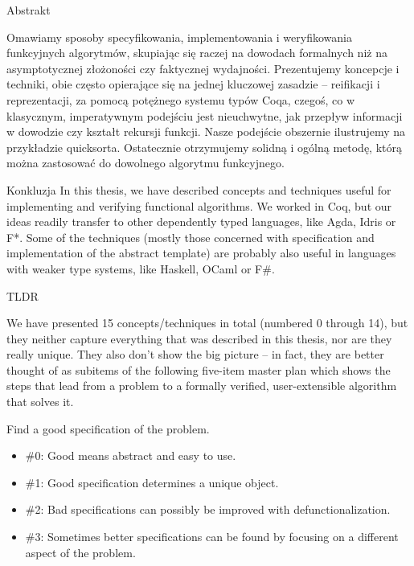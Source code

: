 \documentclass{beamer}
\begin{document}
\begin{frame}{Abstrakt}
\begin{center}
	Omawiamy sposoby specyfikowania, implementowania i weryfikowania funkcyjnych algorytmów, skupiając się raczej na dowodach formalnych niż na asymptotycznej złożoności czy faktycznej wydajności. Prezentujemy koncepcje i techniki, obie często opierające się na jednej kluczowej zasadzie -- reifikacji i reprezentacji, za pomocą potężnego systemu typów Coqa, czegoś, co w klasycznym, imperatywnym podejściu jest nieuchwytne, jak przepływ informacji w dowodzie czy kształt rekursji funkcji. Nasze podejście obszernie ilustrujemy na przykładzie quicksorta. Ostatecznie otrzymujemy solidną i ogólną metodę, którą można zastosować do dowolnego algorytmu funkcyjnego.
\end{center}
\end{frame}



\begin{frame}{Konkluzja}
	In this thesis, we have described concepts and techniques useful for implementing and verifying functional algorithms. We worked in Coq, but our ideas readily transfer to other dependently typed languages, like Agda, Idris or F*. Some of the techniques (mostly those concerned with specification and implementation of the abstract template) are probably also useful in languages with weaker type systems, like Haskell, OCaml or F\#.
\end{frame}

\begin{frame}{TLDR}
	
	We have presented 15 concepts/techniques in total (numbered 0 through 14), but they neither capture everything that was described in this thesis, nor are they really unique. They also don't show the big picture -- in fact, they are better thought of as subitems of the following five-item master plan which shows the steps that lead from a problem to a formally verified, user-extensible algorithm that solves it.
\end{frame}

\begin{frame}{Find a good specification of the problem.}
\begin{itemize}
	\item \#0: Good means abstract and easy to use.
	\item \#1: Good specification determines a unique object.
	\item \#2: Bad specifications can possibly be improved with defunctionalization.
	\item \#3: Sometimes better specifications can be found by focusing on a different aspect of the problem.
\end{itemize}
\end{frame}
\end{document}
